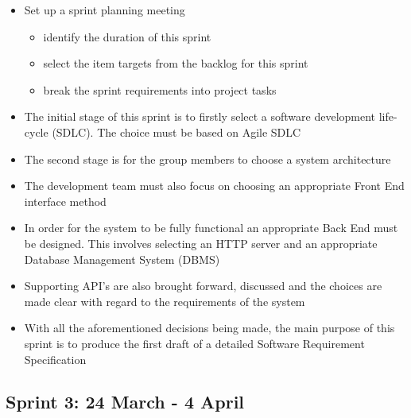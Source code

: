 \documentclass[10pt,twocolumn]{witseiepaper}
\begin{document}
	\begin{itemize}
		\item Set up a sprint planning meeting
		\begin{itemize}
			\item identify the duration of this sprint
			\item select the item targets from the backlog for this sprint
			\item break the sprint requirements into project tasks
		\end{itemize}
		\item The initial stage of this sprint is to firstly select a software development life-cycle (SDLC). The choice must be based on Agile SDLC
		\item The second stage is for the group members to choose a system architecture
		\item The development team must also focus on choosing an appropriate Front End interface method
		\item In order for the system to be fully functional an appropriate Back End must be designed. This involves selecting an HTTP server and an appropriate Database Management System (DBMS)
		\item Supporting API's are also brought forward, discussed and the choices are made clear with regard to the requirements of the system
		\item With all the aforementioned decisions being made, the main purpose of this sprint is to produce the first draft of a detailed Software Requirement Specification				
	\end{itemize}
	
	\subsection{Sprint 3: 24 March - 4 April}
	
\end{document}
